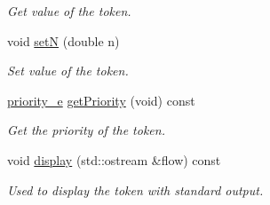 \begin{DoxyCompactItemize}
\begin{DoxyCompactList}\small\item\em Get value of the token. \end{DoxyCompactList}\item 
\hypertarget{class_token_a27e0713a82d278a603e4c430ff0204a3}{}void \hyperlink{class_token_a27e0713a82d278a603e4c430ff0204a3}{set\+N} (double n)\label{class_token_a27e0713a82d278a603e4c430ff0204a3}

\begin{DoxyCompactList}\small\item\em Set value of the token. \end{DoxyCompactList}\item 
\hypertarget{class_token_a87c0015a5a932014b9de9fa0441988ea}{}\hyperlink{token_8h_add90230972b81fc8809dc185a06a9b2a}{priority\+\_\+e} \hyperlink{class_token_a87c0015a5a932014b9de9fa0441988ea}{get\+Priority} (void) const \label{class_token_a87c0015a5a932014b9de9fa0441988ea}

\begin{DoxyCompactList}\small\item\em Get the priority of the token. \end{DoxyCompactList}\item 
\hypertarget{class_token_a04cb002bc8a1ca11487fa254a4455bf9}{}void \hyperlink{class_token_a04cb002bc8a1ca11487fa254a4455bf9}{display} (std\+::ostream \&flow) const \label{class_token_a04cb002bc8a1ca11487fa254a4455bf9}

\begin{DoxyCompactList}\small\item\em Used to display the token with standard output. \end{DoxyCompactList}\end{DoxyCompactItemize}
